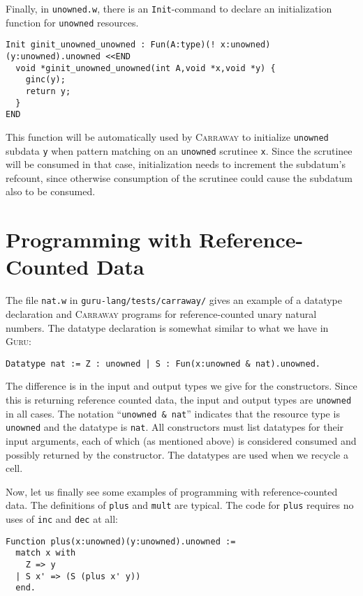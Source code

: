\documentclass{book}[12pt]
\newcommand{\guru}[0]{\textsc{Guru}\xspace}
\newcommand{\carraway}[0]{\textsc{Carraway}\xspace}
\begin{document}
\noindent Finally, in \texttt{unowned.w}, there is an \texttt{Init}-command
to declare an initialization function for \texttt{unowned} resources.  

\begin{verbatim}
Init ginit_unowned_unowned : Fun(A:type)(! x:unowned)(y:unowned).unowned <<END
  void *ginit_unowned_unowned(int A,void *x,void *y) {
    ginc(y);
    return y;
  }
END
\end{verbatim}

\noindent This function will be automatically used by \carraway to
initialize \texttt{unowned} subdata \texttt{y} when pattern matching
on an \texttt{unowned} scrutinee \texttt{x}.  Since the scrutinee will
be consumed in that case, initialization needs to increment the
subdatum's refcount, since otherwise consumption of the scrutinee
could cause the subdatum also to be consumed.

\section{Programming with Reference-Counted Data}
\label{ch9:prog}

The file \texttt{nat.w} in \texttt{guru-lang/tests/carraway/} gives an
example of a datatype declaration and \carraway programs for
reference-counted unary natural numbers.  The datatype declaration
is somewhat similar to what we have in \guru:

\begin{verbatim}
Datatype nat := Z : unowned | S : Fun(x:unowned & nat).unowned.
\end{verbatim}

\noindent The difference is in the input and output types we give for
the constructors.  Since this is returning reference counted data, the
input and output types are \texttt{unowned} in all cases.  The
notation ``\texttt{unowned\ \& nat}'' indicates that the resource type is
\texttt{unowned} and the datatype is \texttt{nat}.  All
constructors must list datatypes for their input arguments, each
of which (as mentioned above) is considered consumed and possibly
returned by the constructor.  The datatypes are used when we
recycle a cell.

Now, let us finally see some examples of programming with
reference-counted data.  The definitions of \texttt{plus} and
\texttt{mult} are typical.  The code for \texttt{plus} requires
no uses of \texttt{inc} and \texttt{dec} at all:

\begin{verbatim}
Function plus(x:unowned)(y:unowned).unowned :=
  match x with
    Z => y
  | S x' => (S (plus x' y))
  end.
\end{verbatim}
\end{document}
